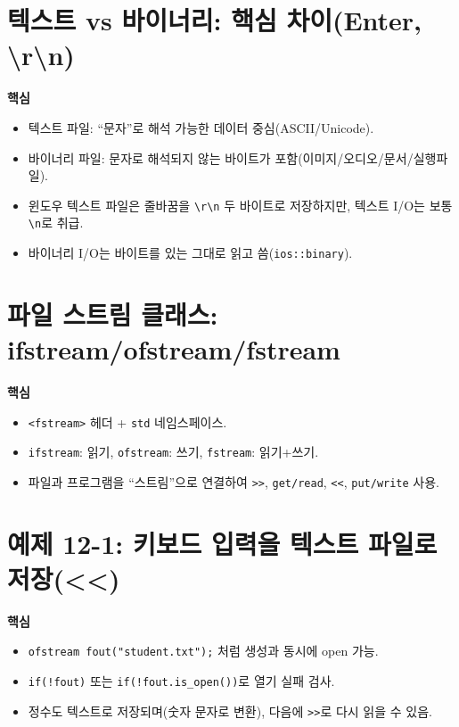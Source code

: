 \documentclass[11pt,a4paper]{article}
\begin{document}
\tableofcontents
\newpage

\section{텍스트 vs 바이너리: 핵심 차이(Enter, \textbackslash r\textbackslash n)}
\begin{GoalBox}
\textbf{핵심}
\begin{itemize}[leftmargin=18pt]
  \item 텍스트 파일: ``문자''로 해석 가능한 데이터 중심(ASCII/Unicode). %
  \item 바이너리 파일: 문자로 해석되지 않는 바이트가 포함(이미지/오디오/문서/실행파일). %
  \item 윈도우 텍스트 파일은 줄바꿈을 \texttt{\textbackslash r\textbackslash n} 두 바이트로 저장하지만, 텍스트 I/O는 보통 \texttt{\textbackslash n}로 취급. %
  \item 바이너리 I/O는 바이트를 있는 그대로 읽고 씀(\texttt{ios::binary}). %
\end{itemize}
\end{GoalBox}

\section{파일 스트림 클래스: ifstream/ofstream/fstream}
\begin{GoalBox}
\textbf{핵심}
\begin{itemize}[leftmargin=18pt]
  \item \texttt{<fstream>} 헤더 + \texttt{std} 네임스페이스. %
  \item \texttt{ifstream}: 읽기, \texttt{ofstream}: 쓰기, \texttt{fstream}: 읽기+쓰기. %
  \item 파일과 프로그램을 ``스트림''으로 연결하여 \texttt{>>}, \texttt{get/read}, \texttt{<<}, \texttt{put/write} 사용. %
\end{itemize}
\end{GoalBox}

\section{예제 12-1: 키보드 입력을 텍스트 파일로 저장(<<)}
\begin{GoalBox}
\textbf{핵심}
\begin{itemize}[leftmargin=18pt]
  \item \texttt{ofstream fout("student.txt");} 처럼 생성과 동시에 open 가능. %
  \item \texttt{if(!fout)} 또는 \texttt{if(!fout.is\_open())}로 열기 실패 검사. %
  \item 정수도 텍스트로 저장되며(숫자 문자로 변환), 다음에 \texttt{>>}로 다시 읽을 수 있음. %
\end{itemize}
\end{GoalBox}
\end{document}
